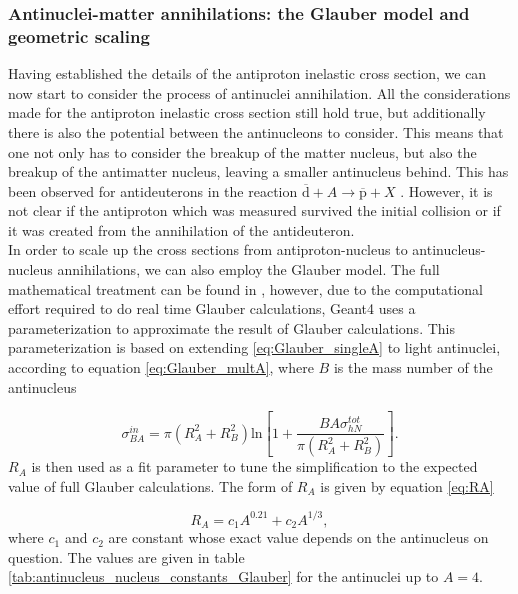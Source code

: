 \subsubsection{Antinuclei-matter annihilations: the Glauber model and geometric scaling}\label{sec:IntroGlauber}
Having established the details of the antiproton inelastic cross section, we can now start to consider the process of antinuclei annihilation. All the considerations made for the antiproton inelastic cross section still hold true, but additionally there is also the potential between the antinucleons to consider. This means that one not only has to consider the breakup of the matter nucleus, but also the breakup of the antimatter nucleus, leaving a smaller antinucleus behind. This has been observed for antideuterons in the reaction $\overline{\mathrm{d}} + A \rightarrow \overline{\mathrm{p}}+X$ \cite{Denisov:1971im, Binon:1970yu}. However, it is not clear if the antiproton which was measured survived the initial collision or if it was created from the annihilation of the antideuteron.\\

In order to scale up the cross sections from antiproton-nucleus to antinucleus-nucleus annihilations, we can also employ the Glauber model. The full mathematical treatment can be found in \cite{Uzhinsky:2011zz}, however, due to the computational effort required to do real time Glauber calculations, Geant4 uses a parameterization to approximate the result of Glauber calculations. This parameterization is based on extending \ref{eq:Glauber_singleA} to light antinuclei, according to equation \ref{eq:Glauber_multA}, where $B$ is the mass number of the antinucleus

\begin{equation}\label{eq:Glauber_multA}
     \sigma_{BA}^{in} = \pi(R_A^2+R_B^2) \mathrm{ln}\left[ 1+\frac{BA\sigma_{hN}^{tot}}{\pi ( R_A^2 + R_B^2)}\right].
\end{equation}
$R_A$ is then used as a fit parameter to tune the simplification to the expected value of full Glauber calculations. The form of $R_A$ is given by equation \ref{eq:RA}

\begin{equation}\label{eq:RA}
    R_A = c_1 A^{0.21}+c_2 A^{1/3},
\end{equation}
where $c_1$ and $c_2$ are constant whose exact value depends on the antinucleus on question. The values are given in table \ref{tab:antinucleus_nucleus_constants_Glauber} for the antinuclei up to $A=4$. 

